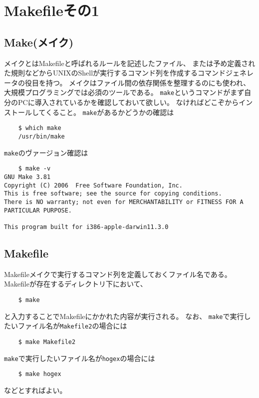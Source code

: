  \section{Makefileその1}
 
 

 \subsection{Make(メイク)}

 メイクとはMakefileと呼ばれるルールを記述したファイル、
 または予め定義された規則などからUNIXのShellが実行するコマンド列を作成するコマンドジェネレータの役目を持つ。
 メイクはファイル間の依存関係を整理するのにも使われ、大規模プログラミングでは必須のツールである。
 \verb|make|というコマンドがまず自分のPCに導入されているかを確認しておいて欲しい。
 なければどこぞからインストールしてくること。
 \verb|make|があるかどうかの確認は
 \begin{verbatim}
	$ which make
	/usr/bin/make
 \end{verbatim}
\verb|make|のヴァージョン確認は
 \begin{verbatim}
	$ make -v
GNU Make 3.81
Copyright (C) 2006  Free Software Foundation, Inc.
This is free software; see the source for copying conditions.
There is NO warranty; not even for MERCHANTABILITY or FITNESS FOR A
PARTICULAR PURPOSE.

This program built for i386-apple-darwin11.3.0
 \end{verbatim}
 
 
 
 \subsection{Makefile}
 Makefileメイクで実行するコマンド列を定義しておくファイル名である。
 Makefileが存在するディレクトリ下において、
 \begin{verbatim}
	$ make
 \end{verbatim}
 と入力することでMakefileにかかれた内容が実行される。
 なお、
 \verb|make|で実行したいファイル名が\verb|Makefile2|の場合には
 \begin{verbatim}
	$ make Makefile2
 \end{verbatim}
 \verb|make|で実行したいファイル名が\verb|hogex|の場合には
 \begin{verbatim}
	$ make hogex
 \end{verbatim}
 などとすればよい。
 
